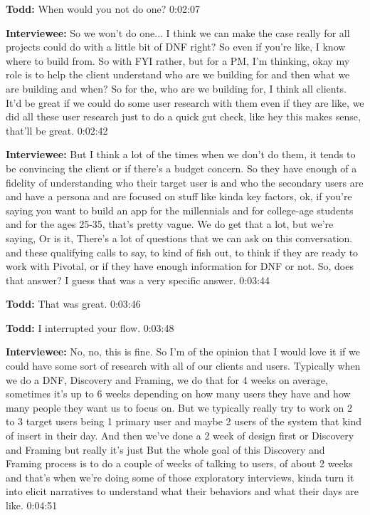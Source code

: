 \textbf{Todd:} When would you not do one?  0:02:07

\textbf{Interviewee:} So we won't do one... I think we can make the case really for all projects could do with a little bit of DNF right? So even if you're like, I know where to build from. So with FYI rather, but for a PM, I'm thinking, okay my role is to help the client understand who are we building for and then what we are building and when? So for the, who are we building for, I think all clients.  It'd be great if we could do some user research with them even if they are like, we did all these user research just to do a quick gut check, like hey this makes sense, that'll be great.   0:02:42

\textbf{Interviewee:} But I think a lot of the times when we don't do them, it tends to be convincing the client or if there's a budget concern.  So they have enough of a fidelity of understanding who their target user is and who the secondary users are and have a persona and are focused on stuff like kinda key factors, ok, if you're saying you want to build an app for the millennials and for college-age students and for the ages 25-35, that's pretty vague.  We do get that a lot, but we're saying,  Or is it,   There's a lot of questions that we can ask on this conversation. and these qualifying calls to say, to kind of fish out, to think if they are ready to work with Pivotal, or if they have enough information for DNF or not. So, does that answer?  I guess that was a very specific answer.  0:03:44

\textbf{Todd:} That was great.  0:03:46

\textbf{Todd:} I interrupted your flow.  0:03:48

\textbf{Interviewee:} No, no, this is fine.  So I'm of the opinion that I would love it if we could have some sort of research with all of our clients and users. Typically when we do a DNF, Discovery and Framing, we do that for 4 weeks on average, sometimes it's up to 6 weeks depending on how many users they have and how many people they want us to focus on.  But we typically really try to work on 2 to 3 target users being 1 primary user and maybe 2 users of the system that kind of insert in their day.  And then we've done a 2 week of design first or Discovery and Framing but really it's just  But the whole goal of this Discovery and Framing process is to do a couple of weeks of talking to users, of about 2 weeks and that's when we're doing some of those exploratory interviews, kinda turn it into elicit narratives to understand what their behaviors and what their days are like.   0:04:51

